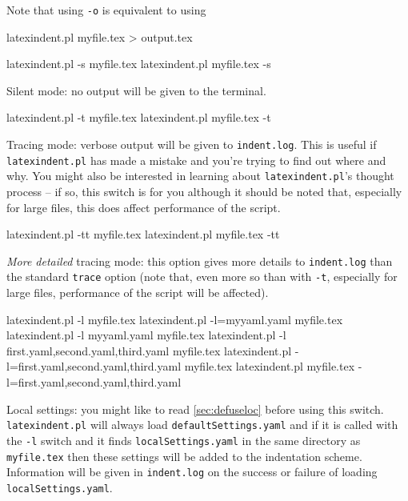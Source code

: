 Note that using \texttt{-o} is equivalent to using 
\begin{commandshell}
latexindent.pl myfile.tex > output.tex
\end{commandshell}

\begin{commandshell}
latexindent.pl -s myfile.tex
latexindent.pl myfile.tex -s
      \end{commandshell}

Silent mode: no output will be given to the terminal.

\begin{commandshell}
latexindent.pl -t myfile.tex
latexindent.pl myfile.tex -t
      \end{commandshell}

\label{page:traceswitch}
Tracing mode: verbose output will be given to \texttt{indent.log}. This
is useful if \texttt{latexindent.pl} has made a mistake and you're
trying to find out where and why. You might also be interested in learning
about \texttt{latexindent.pl}'s thought process -- if so, this
switch is for you although it should be noted that, especially for large files, this does affect
performance of the script.

\begin{commandshell}
latexindent.pl -tt myfile.tex
latexindent.pl myfile.tex -tt
      \end{commandshell}

\emph{More detailed} tracing mode: this option gives more details to \texttt{indent.log}
than the standard \texttt{trace} option (note that, even more so than with \texttt{-t},
especially for large files, performance of the script will be affected).

\begin{commandshell}
latexindent.pl -l myfile.tex
latexindent.pl -l=myyaml.yaml myfile.tex
latexindent.pl -l myyaml.yaml myfile.tex
latexindent.pl -l first.yaml,second.yaml,third.yaml myfile.tex
latexindent.pl -l=first.yaml,second.yaml,third.yaml myfile.tex
latexindent.pl myfile.tex -l=first.yaml,second.yaml,third.yaml 
      \end{commandshell}

\label{page:localswitch}
Local settings: you might like to read \cref{sec:defuseloc} before
using this switch. \texttt{latexindent.pl} will always load \texttt{defaultSettings.yaml}
and if it is called with the \texttt{-l} switch and it finds \texttt{localSettings.yaml}
in the same directory as \texttt{myfile.tex} then these settings will be
added to the indentation scheme. Information will be given in \texttt{indent.log} on
the success or failure of loading \texttt{localSettings.yaml}.

